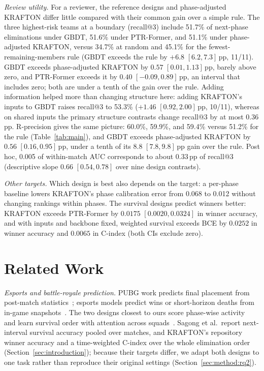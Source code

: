 \documentclass[sigconf,anonymous]{acmart}
\begin{document}
\emph{Review utility.} For a reviewer, the reference designs and phase-adjusted KRAFTON differ little compared with their common gain over a simple rule. The three highest-risk teams at a boundary (recall@3) include 51.7\% of next-phase eliminations under GBDT, 51.6\% under PTR-Former, and 51.1\% under phase-adjusted KRAFTON, versus 34.7\% at random and 45.1\% for the fewest-remaining-members rule (GBDT exceeds the rule by $+6.8$ $[6.2,\allowbreak 7.3]$\,pp, 11/11). GBDT exceeds phase-adjusted KRAFTON by $0.57$ $[0.01,\allowbreak 1.13]$\,pp, barely above zero, and PTR-Former exceeds it by $0.40$ $[-0.09,\allowbreak 0.89]$\,pp, an interval that includes zero; both are under a tenth of the gain over the rule. Adding information helped more than changing structure here: adding KRAFTON's inputs to GBDT raises recall@3 to 53.3\% ($+1.46$ $[0.92,\allowbreak 2.00]$\,pp, 10/11), whereas on shared inputs the primary structure contrasts change recall@3 by at most 0.36\,pp. R-precision gives the same picture: 60.0\%, 59.9\%, and 59.4\% versus 51.2\% for the rule (Table~\ref{tab:main}), and GBDT exceeds phase-adjusted KRAFTON by $0.56$ $[0.16,\allowbreak 0.95]$\,pp, under a tenth of its $8.8$ $[7.8,\allowbreak 9.8]$\,pp gain over the rule. Post hoc, 0.005 of within-match AUC corresponds to about 0.33\,pp of recall@3 (descriptive slope 0.66 $[0.54,\allowbreak 0.78]$ over nine design contrasts).

\emph{Other targets.} Which design is best also depends on the target: a per-phase baseline lowers KRAFTON's phase calibration error from 0.068 to 0.012 without changing rankings within phases. The survival designs predict winners better: KRAFTON exceeds PTR-Former by $0.0175$ $[0.0020,\allowbreak 0.0324]$ in winner accuracy, and with inputs and backbone fixed, weighted survival exceeds BCE by $0.0252$ in winner accuracy and $0.0065$ in C-index (both CIs exclude zero).

\section{Related Work}
\label{sec:related}
\emph{Esports and battle-royale prediction.} PUBG work predicts final placement from post-match statistics~\cite{KagglePUBG,LeeLee25}; esports models predict wins or short-horizon deaths from in-game snapshots~\cite{Hodge21,Katona19,Marshall22}. The two designs closest to ours score phase-wise activity~\cite{Sagong25a} and learn survival order with attention across squads~\cite{KRAFTON}. Sagong et al.\ report next-interval survival accuracy pooled over matches, and KRAFTON's repository winner accuracy and a time-weighted C-index over the whole elimination order (Section~\ref{sec:introduction}); because their targets differ, we adapt both designs to one task rather than reproduce their original settings (Section~\ref{sec:method:rq2}).
\end{document}
